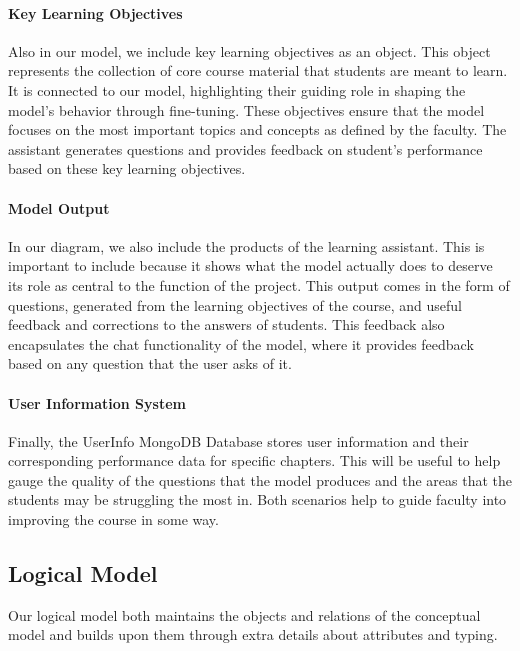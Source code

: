 \documentclass[12pt,a4paper]{article}
\begin{document}
    \paragraph{Key Learning Objectives}
    Also in our model, we include key learning objectives as an object.  This object represents the
    collection of core course material that students are meant to learn.  It is connected to our model,
    highlighting their guiding role in shaping the model's behavior through fine-tuning. These
    objectives ensure that the model focuses on the most important topics and concepts as defined by
    the faculty. The assistant generates questions and provides feedback on student's performance
    based on these key learning objectives.

    \paragraph{Model Output}
    In our diagram, we also include the products of the learning assistant.  This is important to include
    because it shows what the model actually does to deserve its role as central to the function of
    the project.  This output comes in the form of questions, generated from the learning objectives
    of the course, and useful feedback and corrections to the answers of students.  This feedback also
    encapsulates the chat functionality of the model, where it provides feedback based on any question
    that the user asks of it.

    \paragraph{User Information System}
    Finally, the UserInfo MongoDB Database stores user information and their corresponding performance
    data for specific chapters.  This will be useful to help gauge the quality of the questions that
    the model produces and the areas that the students may be struggling the most in.  Both scenarios
    help to guide faculty into improving the course in some way.

    
    \subsection{Logical Model}
    
    Our logical model both maintains the objects and relations of the conceptual model and builds upon
    them through extra details about attributes and typing.
\end{document}

